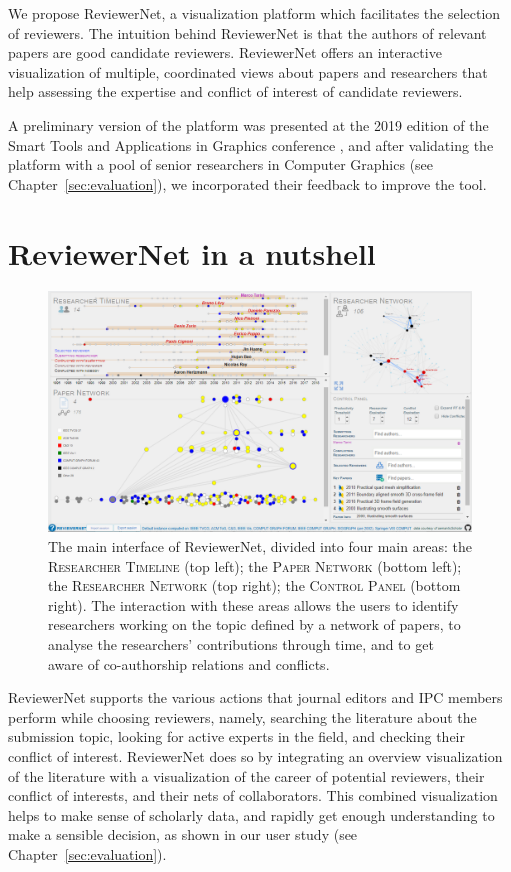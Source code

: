 We propose ReviewerNet, a visualization platform which facilitates the selection of reviewers. The intuition behind ReviewerNet is that the authors of relevant papers are good candidate reviewers. ReviewerNet offers an interactive visualization of multiple, coordinated views about papers and researchers that help assessing the expertise and conflict of interest of candidate reviewers.

A preliminary version of the platform was presented at the 2019 edition of the Smart Tools and Applications in Graphics conference \cite{stag19}, and after validating the platform with a pool of senior researchers in Computer Graphics (see Chapter~\ref{sec:evaluation}), we incorporated their feedback to improve the tool.

\section{ReviewerNet in a nutshell}

\begin{figure}[t]
\centering
\includegraphics[width=\textwidth]{fig/teaser_colormap2.png}
\caption{The main interface of ReviewerNet, divided into four main areas: the \textsc{Researcher Timeline } (top left); the \textsc{Paper Network }(bottom left); the \textsc{Researcher Network } (top right); the \textsc{Control Panel } (bottom right). The interaction with these areas allows the users to identify researchers working on the topic defined by a network of papers, to analyse the researchers' contributions through time, and to get aware of co-authorship relations and conflicts.}
\label{fig:interface}
\end{figure}

ReviewerNet supports the various actions that journal editors and IPC members perform while choosing reviewers, namely, searching the literature about the submission topic, looking for active experts in the field, and checking their conflict of interest. ReviewerNet does so by integrating an overview visualization of the literature with a visualization of the career of potential reviewers, their conflict of interests, and their nets of collaborators. This combined visualization helps to make sense of scholarly data, and rapidly get enough understanding to make a sensible decision, as shown in our user study (see Chapter~\ref{sec:evaluation}). 

